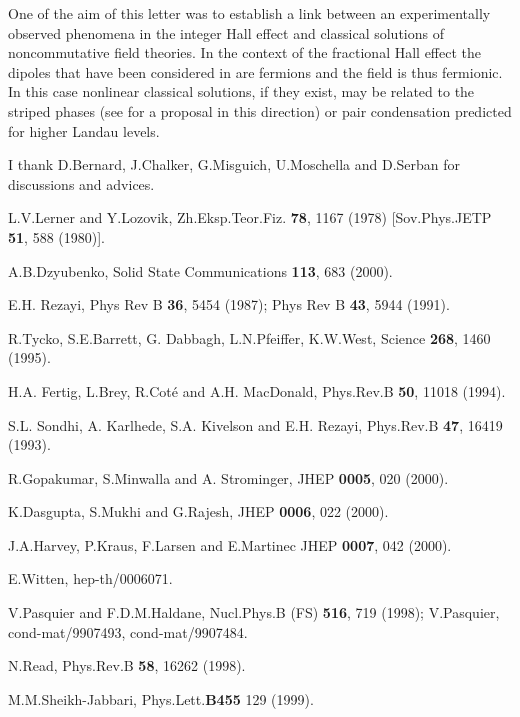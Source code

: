 \documentclass[a4paper,11pt]{article}
\begin{document}
One of the aim of this letter was to establish a link between an
experimentally observed phenomena in the integer Hall effect
and classical solutions of 
noncommutative field theories.
In the context of the fractional Hall effect
the dipoles that have been considered in \cite{PAHA,READ} are fermions and
the field \myHighlight{$\sigma$}\coordHE{} is thus fermionic. 
In this case  nonlinear classical solutions, if they exist,
may be related
to the striped phases \cite{KOU} (see \cite{SO2} for a proposal
in this direction) or pair condensation \cite{MOO}
predicted for higher Landau levels.

\smallskip
I thank D.Bernard, J.Chalker, G.Misguich, U.Moschella and D.Serban for
discussions and advices.




\begin{thebibliography}{99}

L.V.Lerner and Y.Lozovik, Zh.Eksp.Teor.Fiz. {\bf 78}, 1167 (1978)
[Sov.Phys.JETP {\bf 51}, 588 (1980)].

A.B.Dzyubenko, Solid State Communications {\bf 113}, 683 (2000).

 E.H. Rezayi, Phys Rev B {\bf 36}, 5454 (1987);
Phys Rev B {\bf 43}, 5944 (1991).

R.Tycko, S.E.Barrett, G. Dabbagh, L.N.Pfeiffer,
K.W.West, Science {\bf 268}, 1460 (1995).

H.A. Fertig, L.Brey, R.Cot\'e and A.H. MacDonald,
Phys.Rev.B {\bf 50}, 11018 (1994).

S.L. Sondhi, A. Karlhede, S.A. Kivelson and E.H. Rezayi,
Phys.Rev.B {\bf 47}, 16419 (1993).


R.Gopakumar, S.Minwalla and A. Strominger, JHEP {\bf 0005}, 020 (2000).

K.Dasgupta, S.Mukhi and G.Rajesh,  JHEP {\bf 0006}, 022 (2000).

J.A.Harvey, P.Kraus, F.Larsen and E.Martinec JHEP {\bf 0007}, 042 (2000).

E.Witten, hep-th/0006071.

V.Pasquier and F.D.M.Haldane, Nucl.Phys.B (FS) {\bf 516}, 719 (1998);
V.Pasquier, cond-mat/9907493, cond-mat/9907484.

N.Read, Phys.Rev.B {\bf 58}, 16262 (1998).


M.M.Sheikh-Jabbari, Phys.Lett.{\bf B455} 129 (1999).


\end{thebibliography}
\end{document}
